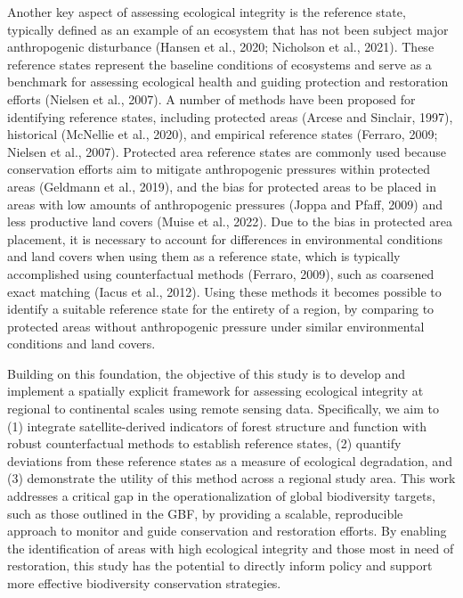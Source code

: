 \documentclass[
]{agujournal2019}
\begin{document}
Another key aspect of assessing ecological integrity is the reference
state, typically defined as an example of an ecosystem that has not been
subject major anthropogenic disturbance (Hansen et al., 2020; Nicholson
et al., 2021). These reference states represent the baseline conditions
of ecosystems and serve as a benchmark for assessing ecological health
and guiding protection and restoration efforts (Nielsen et al., 2007). A
number of methods have been proposed for identifying reference states,
including protected areas (Arcese and Sinclair, 1997), historical
(McNellie et al., 2020), and empirical reference states (Ferraro, 2009;
Nielsen et al., 2007). Protected area reference states are commonly used
because conservation efforts aim to mitigate anthropogenic pressures
within protected areas (Geldmann et al., 2019), and the bias for
protected areas to be placed in areas with low amounts of anthropogenic
pressures (Joppa and Pfaff, 2009) and less productive land covers (Muise
et al., 2022). Due to the bias in protected area placement, it is
necessary to account for differences in environmental conditions and
land covers when using them as a reference state, which is typically
accomplished using counterfactual methods (Ferraro, 2009), such as
coarsened exact matching (Iacus et al., 2012). Using these methods it
becomes possible to identify a suitable reference state for the entirety
of a region, by comparing to protected areas without anthropogenic
pressure under similar environmental conditions and land covers.

Building on this foundation, the objective of this study is to develop
and implement a spatially explicit framework for assessing ecological
integrity at regional to continental scales using remote sensing data.
Specifically, we aim to (1) integrate satellite-derived indicators of
forest structure and function with robust counterfactual methods to
establish reference states, (2) quantify deviations from these reference
states as a measure of ecological degradation, and (3) demonstrate the
utility of this method across a regional study area. This work addresses
a critical gap in the operationalization of global biodiversity targets,
such as those outlined in the GBF, by providing a scalable, reproducible
approach to monitor and guide conservation and restoration efforts. By
enabling the identification of areas with high ecological integrity and
those most in need of restoration, this study has the potential to
directly inform policy and support more effective biodiversity
conservation strategies.
\end{document}
